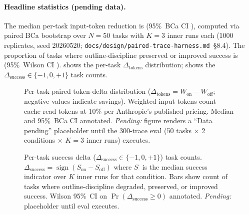 \paragraph{Headline statistics (pending data).}
The median per-task input-token reduction is
\textbf{\headlineDeltaTokens} (95\%~BCa CI \headlineDeltaTokensCI),
computed via paired BCa bootstrap over $N{=}50$ tasks with $K{=}3$
inner runs each (1000 replicates, seed 20260520;
\texttt{docs/design/paired-trace-harness.md}~\S8.4).
The proportion of tasks where outline-discipline preserved or improved
success is \textbf{\successProportionAtLeastZero}
(95\%~Wilson CI \successProportionCI).
 shows the per-task
$\Delta_\text{tokens}$ distribution;
 shows the
$\Delta_\text{success} \in \{-1, 0, +1\}$ task counts.

\begin{figure}[ht]
\centering

\caption{Per-task paired token-delta distribution
($\Delta_\text{tokens} = W_\text{on} - W_\text{off}$; negative values
indicate savings).  Weighted input tokens count cache-read tokens at
10\% per Anthropic's published pricing.  Median and 95\%~BCa CI
annotated.  \textit{Pending:} figure renders a ``Data pending''
placeholder until the 300-trace eval
(50 tasks $\times$ 2 conditions $\times$ $K{=}3$ inner runs) executes.}
\label{fig:paired-tokens-distribution}
\end{figure}

\begin{figure}[ht]
\centering

\caption{Per-task success delta
($\Delta_\text{success} \in \{-1, 0, +1\}$) task counts.
$\Delta_\text{success} = \operatorname{sign}(S_\text{on} - S_\text{off})$
where $S_{\cdot}$ is the median success indicator over $K$ inner runs for
that condition.  Bars show count of tasks where outline-discipline
degraded, preserved, or improved success.  Wilson 95\%~CI on
$\Pr(\Delta_\text{success} \geq 0)$ annotated.
\textit{Pending:} placeholder until eval executes.}
\label{fig:paired-success-distribution}
\end{figure}

